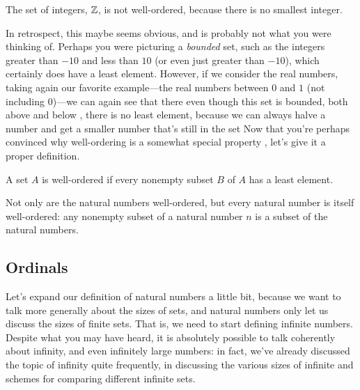 \begin{example}
    The set of integers, $\mathbb{Z}$, is not well-ordered, because there is no smallest integer.
\end{example}

In retrospect, this maybe seems obvious, and is probably not what you were thinking of.
Perhaps you were picturing a \emph{bounded} set, such as the integers greater than $-10$ and less than $10$ (or even just greater than $-10$), which certainly does have a least element.
However, if we consider the real numbers, taking again our favorite example---the real numbers between $0$ and $1$ (not including $0$)---we can again see that there even though this set is bounded, both above and below , there is no least element, because we can always halve a number and get a smaller number that's still in the set 
Now that you're perhaps convinced why well-ordering is a somewhat special property , let's give it a proper definition.

\begin{definition}
    A set $A$ is well-ordered if every nonempty subset $B$ of $A$ has a least element.
\end{definition}

Not only are the natural numbers well-ordered, but every natural number is itself well-ordered: any nonempty subset of a natural number $n$ is a subset of the natural numbers.


\subsection{Ordinals}

Let's expand our definition of natural numbers a little bit, because we want to talk more generally about the sizes of sets, and natural numbers only let us discuss the sizes of finite sets.
That is, we need to start defining infinite numbers.
Despite what you may have heard, it is absolutely possible to talk coherently about infinity, and even infinitely large numbers: in fact, we've already discussed the topic of infinity quite frequently, in discussing the various sizes of infinite and schemes for comparing different infinite sets.

